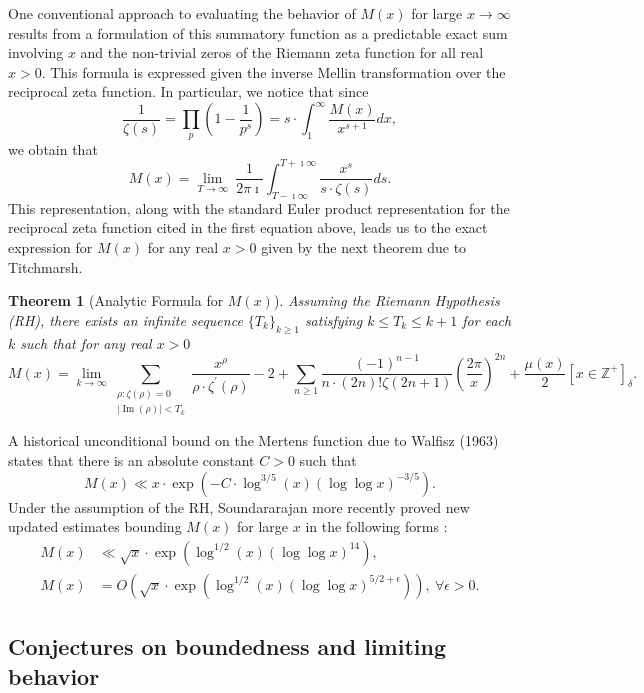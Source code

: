 \documentclass[11pt,reqno,a4letter]{article}
\numberwithin{figure}{section}
\numberwithin{table}{section}
\newcommand{\Iverson}[1]{\ensuremath{\left[#1\right]_{\delta}}}
\theoremstyle{plain}
\newtheorem{theorem}{Theorem}
\numberwithin{theorem}{section}
\theoremstyle{definition}
\renewcommand{\Im}{\operatorname{Im}}
\begin{document}
One conventional approach to evaluating the behavior of $M(x)$ for large 
$x \rightarrow \infty$ results from a formulation of this summatory 
function as a predictable exact sum involving $x$ and the non-trivial 
zeros of the Riemann zeta function for all real $x > 0$. 
This formula is expressed given the inverse Mellin transformation 
over the reciprocal zeta function. In particular, 
we notice that since 
\[
\frac{1}{\zeta(s)} = \prod_{p} \left(1 - \frac{1}{p^s}\right) = 
     s \cdot \int_1^{\infty} \frac{M(x)}{x^{s+1}} dx, 
\]
we obtain that 
\[
M(x) = \lim_{T \rightarrow \infty}\ \frac{1}{2\pi\imath} \int_{T-\imath\infty}^{T+\imath\infty} 
     \frac{x^s}{s \cdot \zeta(s)} ds. 
\] 
This representation, along with the standard Euler product 
representation for the reciprocal zeta function cited in the first equation above, leads us to the 
exact expression for $M(x)$ for any real $x > 0$ 
given by the next theorem due to Titchmarsh. 
\nocite{TITCHMARSH} 

\begin{theorem}[Analytic Formula for $M(x)$] 
\label{theorem_MxMellinTransformInvFormula} 
Assuming the Riemann Hypothesis (RH), there exists an infinite sequence 
$\{T_k\}_{k \geq 1}$ satisfying $k \leq T_k \leq k+1$ for each $k$ 
such that for any real $x > 0$ 
\[
M(x) = \lim_{k \rightarrow \infty} 
     \sum_{\substack{\rho: \zeta(\rho) = 0 \\ |\Im(\rho)| < T_k}} 
     \frac{x^{\rho}}{\rho \cdot \zeta^{\prime}(\rho)} - 2 + 
     \sum_{n \geq 1} \frac{(-1)^{n-1}}{n \cdot (2n)! \zeta(2n+1)} 
     \left(\frac{2\pi}{x}\right)^{2n} + 
     \frac{\mu(x)}{2} \Iverson{x \in \mathbb{Z}^{+}}. 
\] 
\end{theorem} 

A historical unconditional bound on the Mertens function due to Walfisz (1963) 
states that there is an absolute constant $C > 0$ such that 
$$M(x) \ll x \cdot \exp\left(-C \cdot \log^{3/5}(x) 
  (\log\log x)^{-3/5}\right).$$ 
Under the assumption of the RH, Soundararajan more recently proved new updated estimates 
bounding $M(x)$ for large $x$ in the following forms \cite{SOUND-MERTENS-ANNALS}: 
\begin{align*} 
M(x) & \ll \sqrt{x} \cdot \exp\left(\log^{1/2}(x) (\log\log x)^{14}\right), \\ 
M(x) & = O\left(\sqrt{x} \cdot \exp\left( 
     \log^{1/2}(x) (\log\log x)^{5/2+\epsilon}\right)\right),\ 
     \forall \epsilon > 0. 
\end{align*} 

\subsection{Conjectures on boundedness and limiting behavior} 
\end{document}
